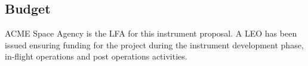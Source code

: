 \subsection{Budget}
ACME Space Agency is the \ac{LFA} for this instrument proposal. A \ac{LEO} has been issued ensuring funding for the project during the instrument development phase, in-flight operations and post operations activities.